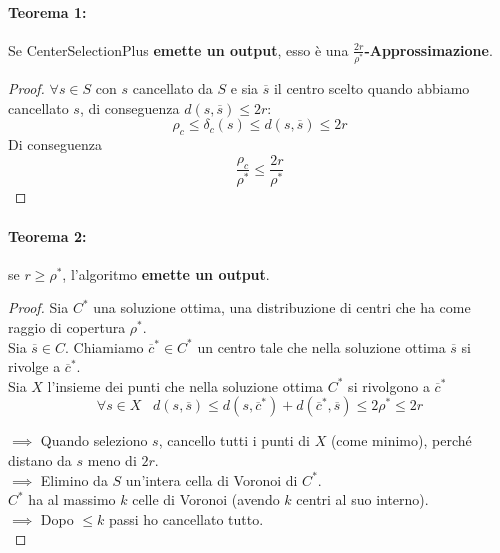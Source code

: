 \newpage

\paragraph{Teorema 1:} Se CenterSelectionPlus \textbf{emette un output}, esso è una \textbf{$\frac{2r}{\rho^\ast}$-Approssimazione}.

\begin{proof}
	$\forall s \in S$ con $s$ cancellato da $S$ e sia $\overline{s}$ il centro scelto quando abbiamo cancellato $s$, di conseguenza $d(s, \overline{s}) \leq 2r$:
	$$\rho_c \leq \delta_c (s) \leq d(s, \overline{s}) \leq 2r $$
	Di conseguenza
	$$ \frac{\rho_c}{\rho^\ast} \leq \frac{2r}{\rho^\ast}$$
\end{proof}

\paragraph{Teorema 2:} se $r \geq \rho^\ast$, l'algoritmo \textbf{emette un output}.\\

\begin{proof}
	Sia $C^\ast$ una soluzione ottima, una distribuzione di centri che ha come raggio di copertura $\rho^\ast$.  \\
	Sia $\overline{s} \in C$. Chiamiamo $\overline{c}^\ast \in C^\ast$ un centro tale che nella soluzione ottima $\overline{s}$ si rivolge a $\overline{c}^\ast$.\\
	Sia $X$ l'insieme dei punti che nella soluzione ottima $C^\ast$ si rivolgono a $\overline{c}^\ast$
	$$ \forall s \in X \;\;\; d(s, \overline{s}) \leq d(s, \overline{c}^\ast) + d(\overline{c}^\ast, \overline{s}) \leq 2 \rho^\ast \leq 2r $$
	
	$\implies$ Quando seleziono $s$, cancello tutti i punti di $X$ (come minimo), perché distano da $s$ meno di $2r$.\\
	$\implies$ Elimino da $S$ un'intera cella di Voronoi di $C^\ast$.\\
	
	$C^\ast$ ha al massimo $k$ celle di Voronoi (avendo $k$ centri al suo interno).\\
	$\implies$ Dopo $\leq k$ passi ho cancellato tutto.\\
\end{proof}

